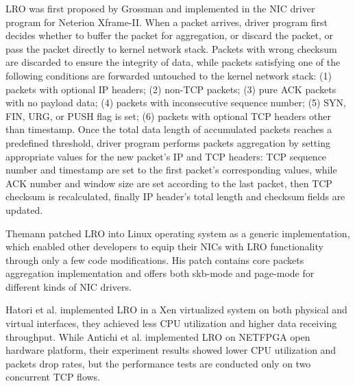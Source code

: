 \documentclass[conference]{IEEEtran}
\begin{document}
LRO was first proposed by Grossman\cite{grossman2005large} and implemented in the NIC driver program for Neterion Xframe-II. When a packet arrives, driver program first decides whether to buffer the packet for aggregation, or discard the packet, or pass the packet directly to kernel network stack. Packets with wrong checksum are discarded to ensure the integrity of data, while packets satisfying one of the following conditions are forwarded untouched to the kernel network stack: (1) packets with optional IP headers; (2) non-TCP packets; (3) pure ACK packets with no payload data; (4) packets with inconsecutive sequence number; (5) SYN, FIN, URG, or PUSH flag is set; (6) packets with optional TCP headers other than timestamp. Once the total data length of accumulated packets reaches a predefined threshold, driver program performs packets aggregation by setting appropriate values for the new packet's IP and TCP headers: TCP sequence number and timestamp are set to the first packet's corresponding values, while ACK number and window size are set according to the last packet, then TCP checksum is recalculated, finally IP header's total length and checksum fields are updated.

Themann\cite{theman2007lro} patched LRO into Linux operating system as a generic implementation, which enabled other developers to equip their NICs with LRO functionality through only a few code modifications. His patch contains core packets aggregation implementation and offers both skb-mode and page-mode for different kinds of NIC drivers.

Hatori\cite{hatori2008implementation} et al. implemented LRO in a Xen virtualized system on both physical and virtual interfaces, they achieved less CPU utilization and higher data receiving throughput. While Antichi\cite{antichi2013implementation} et al. implemented LRO on NETFPGA open hardware platform, their experiment results showed lower CPU utilization and packets drop rates, but the performance tests are conducted only on two concurrent TCP flows.
\end{document}
